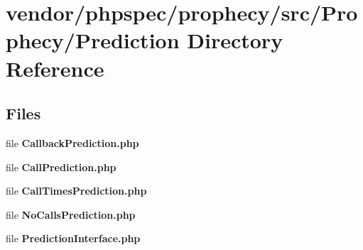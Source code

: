 \section{vendor/phpspec/prophecy/src/\+Prophecy/\+Prediction Directory Reference}
\label{dir_3bac85d04a93dc7870b93a57e2738e50}
\subsection*{Files}
\begin{DoxyCompactItemize}
\item 
file {\bf Callback\+Prediction.\+php}
\item 
file {\bf Call\+Prediction.\+php}
\item 
file {\bf Call\+Times\+Prediction.\+php}
\item 
file {\bf No\+Calls\+Prediction.\+php}
\item 
file {\bf Prediction\+Interface.\+php}
\end{DoxyCompactItemize}
